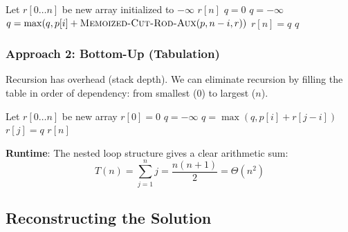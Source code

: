 \documentclass[12pt]{article}
\theoremstyle{blueplain}
\theoremstyle{bluedef}
\theoremstyle{blueremark}
\begin{document}
\begin{algorithm}
    \caption{Memoized-Cut-Rod(p, n)}\label{alg:memoCutRod}
    \begin{algorithmic}[1]
        \State Let $r[0 \dots n]$ be new array initialized to $-\infty$
        \State \Return {}
        \EndProcedure
        \Statex {}
        \State \Return $r[n]$ 
        \EndIf
        \State $q = 0$
        \Else
        \State $q = -\infty$
         
        \State $q = \max(q, p[i] + \Call{Memoized-Cut-Rod-Aux}{p, n-i, r})$
        \EndFor
        \EndIf
        \State $r[n] = q$ 
        \State \Return $q$
        \EndProcedure
    \end{algorithmic}
\end{algorithm}

\subsubsection{Approach 2: Bottom-Up (Tabulation)}
Recursion has overhead (stack depth). We can eliminate recursion by filling the table in order of dependency: from smallest ($0$) to largest ($n$).

\begin{algorithm}
    \caption{Bottom-Up-Cut-Rod(p, n)}\label{alg:bottomUpCutRod}
    \begin{algorithmic}[1]
        \State Let $r[0 \dots n]$ be new array
        \State $r[0] = 0$
         
        \State $q = -\infty$
         
        \State {}
        \State $q = \max(q, p[i] + r[j-i])$
        \EndFor
        \State $r[j] = q$
        \EndFor
        \Return $r[n]$
        \EndProcedure
    \end{algorithmic}
\end{algorithm}
\textbf{Runtime}: The nested loop structure gives a clear arithmetic sum:
\[ T(n) = \sum_{j=1}^n j = \frac{n(n+1)}{2} = \Theta(n^2) \]

\subsection{Reconstructing the Solution}
\end{document}
